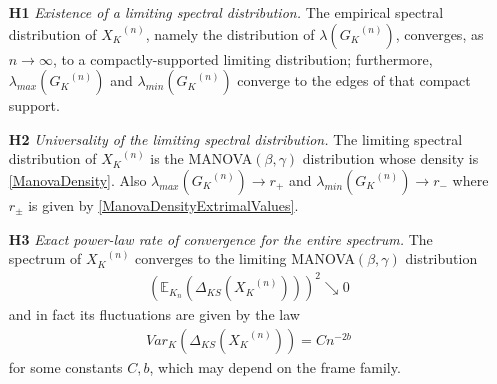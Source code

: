 \documentclass[a4paper,12pt]{article}
\newcommand{\E}{\ensuremath{\mathbb{E}}}
\newcommand{\m}{m}
\newcommand{\Xk}{\ensuremath{X_K}}
\newcommand{\Xkn}{\ensuremath{X_{K_n}}}
\newcommand{\Gk}{\ensuremath{G_K}}
\begin{document}
\begin{enumerate}
\item[{\bf H1}] {\em Existence of a limiting spectral distribution.} 
The empirical spectral distribution of $\Xk^{(n)}$, namely the 
distribution of $\lambda(\Gk^{(n)})$, converges, as $n\to \infty$, 
to a compactly-supported limiting distribution; furthermore, 
$\lambda_{max}(\Gk^{(n)})$ and $\lambda_{min}(\Gk^{(n)})$ converge to the
edges of that compact support.

\item[{\bf H2}] {\em Universality of the limiting spectral distribution.} 
The limiting 
spectral distribution of $\Xk^{(n)}$ is the 
MANOVA$(\beta,\gamma)$ distribution  \cite{wachter} whose density is 
\eqref{ManovaDensity}. Also 
$\lambda_{max}(\Gk^{(n)})\to r_+$ and $\lambda_{min}(\Gk^{(n)})\to r_-$
where $r_\pm$ is given by \eqref{ManovaDensityExtrimalValues}.



\item[{\bf H3}] {\em Exact power-law rate of convergence for the entire
spectrum.}
The spectrum of $\Xk^{(n)}$ converges to the limiting
MANOVA$(\beta,\gamma)$ distribution
\begin{eqnarray*} 
   \left(\E_{K_n}\left(\Delta_{KS}(\Xk^{(n)})\right)\right)^2 \searrow 0
\end{eqnarray*}
and in fact its fluctuations are given by the law
\begin{eqnarray} \label{KS_conv:eq}
Var_{K}(\Delta_{KS}(\Xk^{(n)}))=Cn^{-2b} 
\end{eqnarray}
for some constants $C,b$, which may depend on the frame family.


\end{enumerate}
\end{document}
